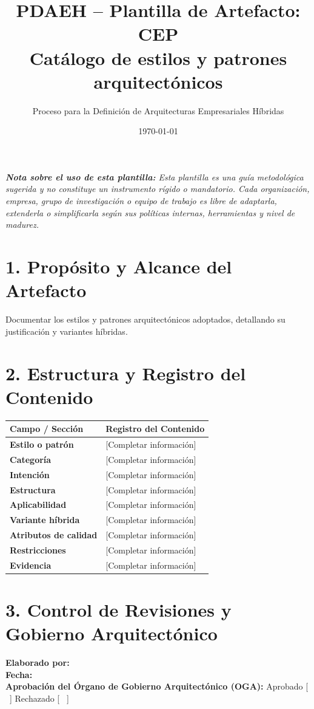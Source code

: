 \documentclass[11pt,a4paper]{article}
\title{\textbf{\color{brandgreen} PDAEH -- Plantilla de Artefacto: CEP} \\[0.3em] \large Catálogo de estilos y patrones arquitectónicos}
\author{Proceso para la Definición de Arquitecturas Empresariales Híbridas}
\date{\today}
\begin{document}
\maketitle

\noindent \textit{\textbf{Nota sobre el uso de esta plantilla:} Esta plantilla es una guía metodológica sugerida y no constituye un instrumento rígido o mandatorio. Cada organización, empresa, grupo de investigación o equipo de trabajo es libre de adaptarla, extenderla o simplificarla según sus políticas internas, herramientas y nivel de madurez.}

\section*{1. Propósito y Alcance del Artefacto}
Documentar los estilos y patrones arquitectónicos adoptados, detallando su justificación y variantes híbridas.

\section*{2. Estructura y Registro del Contenido}
\begin{tabularx}{\textwidth}{|>{\bfseries}p{4.5cm}|X|}
    \hline
    \rowcolor[gray]{0.92} Campo / Sección & Registro del Contenido \\ \hline
    \textbf{Estilo o patrón} & [Completar información] \\ \hline
    \textbf{Categoría} & [Completar información] \\ \hline
    \textbf{Intención} & [Completar información] \\ \hline
    \textbf{Estructura} & [Completar información] \\ \hline
    \textbf{Aplicabilidad} & [Completar información] \\ \hline
    \textbf{Variante híbrida} & [Completar información] \\ \hline
    \textbf{Atributos de calidad} & [Completar información] \\ \hline
    \textbf{Restricciones} & [Completar información] \\ \hline
    \textbf{Evidencia} & [Completar información] \\ \hline
\end{tabularx}

\vspace{1.2cm}
\section*{3. Control de Revisiones y Gobierno Arquitectónico}
\noindent \textbf{Elaborado por:} \hrulefill \\[0.5em]
\textbf{Fecha:} \hrulefill \\[0.5em]
\textbf{Aprobación del Órgano de Gobierno Arquitectónico (OGA):} Aprobado [ \, ] \quad Rechazado [ \, ]
\end{document}
